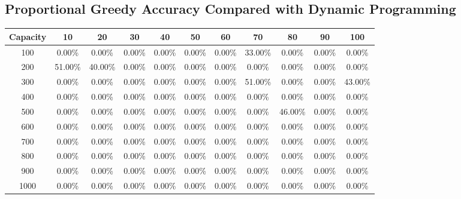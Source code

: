 \documentclass{article}
\begin{document}
\subsection{Proportional Greedy Accuracy Compared with Dynamic Programming}
\begin{center}
\begin{tabular}{ccccccccccc}
\toprule
Capacity & 10 & 20 & 30 & 40 & 50 & 60 & 70 & 80 & 90 & 100 \\
\midrule
100 & 0.00\% & 0.00\% & 0.00\% & 0.00\% & 0.00\% & 0.00\% & 33.00\% & 0.00\% & 0.00\% & 0.00\% \\
200 & 51.00\% & 40.00\% & 0.00\% & 0.00\% & 0.00\% & 0.00\% & 0.00\% & 0.00\% & 0.00\% & 0.00\% \\
300 & 0.00\% & 0.00\% & 0.00\% & 0.00\% & 0.00\% & 0.00\% & 51.00\% & 0.00\% & 0.00\% & 43.00\% \\
400 & 0.00\% & 0.00\% & 0.00\% & 0.00\% & 0.00\% & 0.00\% & 0.00\% & 0.00\% & 0.00\% & 0.00\% \\
500 & 0.00\% & 0.00\% & 0.00\% & 0.00\% & 0.00\% & 0.00\% & 0.00\% & 46.00\% & 0.00\% & 0.00\% \\
600 & 0.00\% & 0.00\% & 0.00\% & 0.00\% & 0.00\% & 0.00\% & 0.00\% & 0.00\% & 0.00\% & 0.00\% \\
700 & 0.00\% & 0.00\% & 0.00\% & 0.00\% & 0.00\% & 0.00\% & 0.00\% & 0.00\% & 0.00\% & 0.00\% \\
800 & 0.00\% & 0.00\% & 0.00\% & 0.00\% & 0.00\% & 0.00\% & 0.00\% & 0.00\% & 0.00\% & 0.00\% \\
900 & 0.00\% & 0.00\% & 0.00\% & 0.00\% & 0.00\% & 0.00\% & 0.00\% & 0.00\% & 0.00\% & 0.00\% \\
1000 & 0.00\% & 0.00\% & 0.00\% & 0.00\% & 0.00\% & 0.00\% & 0.00\% & 0.00\% & 0.00\% & 0.00\% \\
\bottomrule
\end{tabular}
\end{center}
\end{document}
